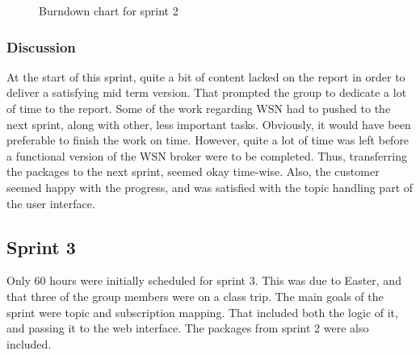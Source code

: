 \begin{center}
  \begin{figure}[ht!]
    \caption{Burndown chart for sprint 2}
    \label{fig:sprint 2, burndown}
  \end{figure}
\end{center}

\subsubsection{Discussion}
\label{subsec:project_lifecycle-development-sprint_2-discussion}

At the start of this sprint, quite a bit of content lacked on the report in order to deliver a satisfying mid term version. That prompted the group to dedicate a lot of time to the report. Some of the work regarding WSN had to pushed to the next sprint, along with other, less important tasks. Obviously, it would have been preferable to finish the work on time. However, quite a lot of time was left before a functional version of the WSN broker were to be completed. Thus, transferring the packages to the next sprint, seemed okay time-wise. Also, the customer seemed happy with the progress, and was satisfied with the topic handling part of the user interface.

\subsection{Sprint 3}
\label{subsec:project_lifecycle-development-sprint_3}

Only 60 hours were initially scheduled for sprint 3. This was due to Easter, and that three of the group members were on a class trip. The main goals of the sprint were topic and subscription mapping. That included both the logic of it, and passing it to the web interface. The packages from sprint 2 were also included.

